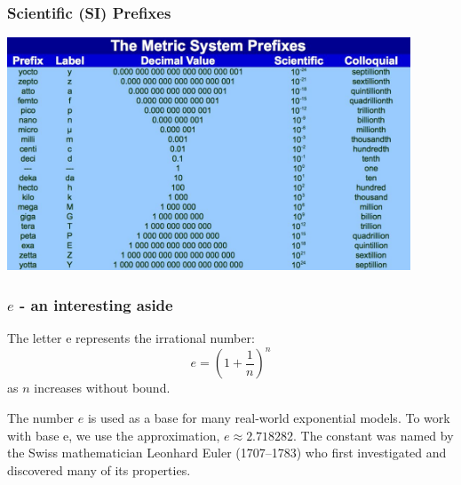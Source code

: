 \documentclass{beamer}
\begin{document}
\begin{frame}\frametitle{Scientific (SI) Prefixes}
\begin{center}
\includegraphics[width=12cm]{fig/si_prefixes.jpg}
\end{center}
\end{frame}

\begin{frame}\frametitle{$e$ - an interesting aside}
The letter e represents the irrational number:
\begin{equation}
e = (1 + \frac{1}{n})^n
\end{equation}
as $n$ increases without bound. \newline



The number $e$ is used as a base for many real-world exponential models. To work with base e, we use the approximation,  $e \approx 2.718282$. The constant was named by the Swiss mathematician Leonhard Euler (1707–1783) who first investigated and discovered many of its properties.
\end{frame}
\end{document}
